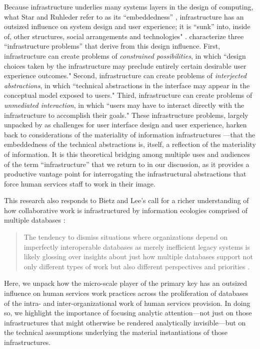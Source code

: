 Because infrastructure underlies many systems layers in the design of computing, what Star and Ruhleder refer to as its ``embeddedness'' \citep{Star1996Ecology}, infrastructure has an outsized influence on system design and user experience; it is ``sunk'' into, inside of, other structures, social arrangements and technologies" \citep{Star1996Ecology}. \citet{Edwards2010InfraProb} characterize three ``infrastructure problems''  that derive from this design influence. First, infrastructure can create problems of \textit{constrained possibilities}, in which ``design choices taken by the infrastructure may preclude entirely certain desirable user experience outcomes." Second, infrastructure can create problems of \textit{interjected abstractions}, in which ``technical abstractions in the interface may appear in the conceptual model exposed to users." Third, infrastructure can create problems of \textit{unmediated interaction}, in which ``users may have to interact directly with the infrastructure to accomplish their goals." These infrastructure problems, largely unpacked by \citet{Edwards2010InfraProb} as challenges for user interface design and user experience, harken back to considerations of the materiality of information infrastructures \citep{Dourish2017Stuff}---that the embeddedness \citep{Star1996Ecology} of the technical abstractions is, itself, a reflection of the materiality of information. It is this theoretical bridging among multiple uses and audiences of the term ``infrastructure'' that we return to in our discussion, as it provides a productive vantage point for interrogating the infrastructural abstractions that force human services staff to work in their image. 

This research also responds to Bietz and Lee's call for a richer understanding of how collaborative work is infrastructured by information ecologies comprised of multiple databases \citep{Bietz2009Collaboration}:

\begin{quote}\singlespacing The tendency to dismiss situations where organizations depend on imperfectly interoperable databases as merely inefficient legacy systems is likely glossing over insights about just how multiple databases support not only different types of work but also different perspectives and priorities \citep{Bietz2009Collaboration}.\end{quote}

Here, we unpack how the micro-scale player of the primary key has an outsized influence on human services work practices across the proliferation of databases \citep{Voida2011Homebrew} of the intra- and inter-organizational work of human services provision. In doing so, we highlight the importance of focusing analytic attention---not just on those infrastructures that might otherwise be rendered analytically invisible---but on the technical assumptions underlying the material instantiations of those infrastructures. 

